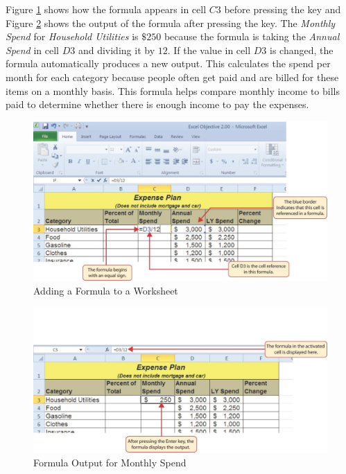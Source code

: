 Figure \ref{02:fig03} shows how the formula appears in cell $ C3 $ before pressing the  key and Figure \ref{02:fig04} shows the output of the formula after pressing the  key. The \textit{Monthly Spend} for \textit{Household Utilities} is $ \$250 $ because the formula is taking the \textit{Annual Spend} in cell $ D3 $ and dividing it by $ 12 $. If the value in cell $ D3 $ is changed, the formula automatically produces a new output. This calculates the spend per month for each category because people often get paid and are billed for these items on a monthly basis. This formula helps compare monthly income to bills paid to determine whether there is enough income to pay the expenses.

\begin{figure}[H]
	\centering
	\includegraphics[width=\maxwidth{.95\linewidth}]{gfx/ch02_fig03}
	\caption{Adding a Formula to a Worksheet}
	\label{02:fig03}
\end{figure}

\begin{figure}[H]
	\centering
	\includegraphics[width=\maxwidth{.95\linewidth}]{gfx/ch02_fig04}
	\caption{Formula Output for Monthly Spend}
	\label{02:fig04}
\end{figure}

